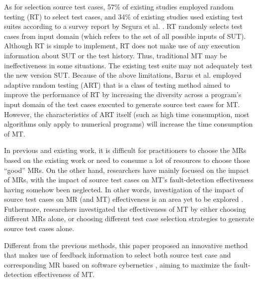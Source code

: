 \documentclass[10pt,journal,compsoc]{IEEEtran}
\begin{document}
As for selection source test cases, 57\% of existing studies employed random testing (RT) to select test cases, and 34\% of existing studies used existing test suites according to a survey report by Segura et al. \cite{segura2016survey}. RT randomly selects test cases from input domain (which refers to the set of all possible inputs of SUT). Although RT is simple to implement, RT does not make use of any execution information about SUT or the test history. Thus, traditional MT may be ineffectiveness in some situations. The existing test suite may not adequately test the new version SUT. Because of the above limitations, Barus et al. \cite{barus2016impact} employed adaptive random testing (ART) \cite{chen2004adaptive} that is a class of testing method aimed to improve the performance of RT by increasing the diversity across a program's input domain of the test cases executed to generate source test cases for MT. However, the characteristics of ART itself (such as high time consumption, most algorithms only apply to numerical programs) will increase the time consumption of MT. 

In previous and existing work, it is difficult for practitioners to choose the MRs based on the existing work or need to consume a lot of resources to choose those ``good'' MRs. On the other hand, researchers have mainly focused on the impact of MRs, with the impact of source test cases on MT’s fault-detection effectiveness having somehow been neglected. In other words, investigation of the impact of
source test cases on MR (and MT) effectiveness is an area yet to be explored \cite{chen2018metamorphic}. Futhermore, researchers investigated the effectiveness of MT by either choosing different MRs alone, or choosing different test case selection strategies to generate source test cases alone. 

Different from the previous methods, this paper proposed an innovative method that makes use of feedback information to select both source test case and corresponding MR based on software cybernetics \cite{cangussu2007software, yang2017modern}, aiming to maximize the fault-detection effectiveness of MT.
\end{document}
